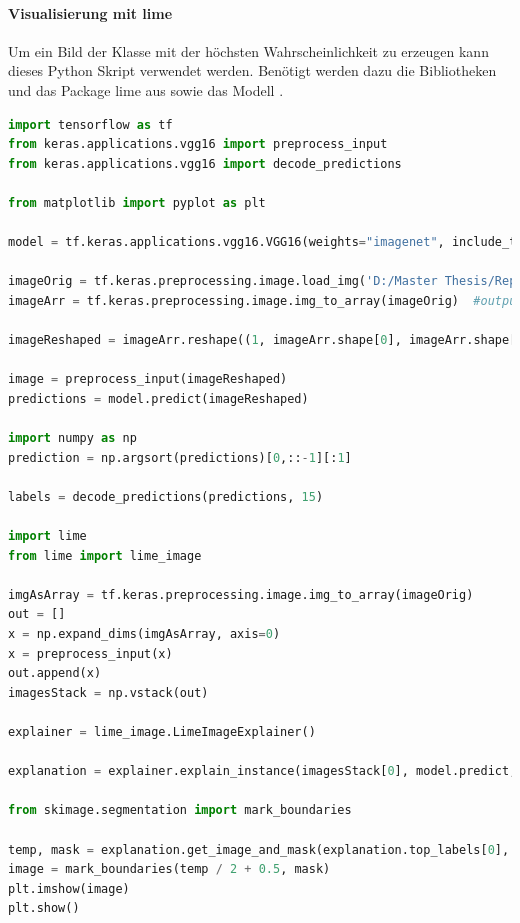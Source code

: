 \documentclass[
  12pt, %
  a4paper, %
  oneside, %
  openany, 
  numbers=noenddot, %
  BCOR=5mm, %
  parskip=half*, %
  thesis, %
]{bfhbook}
\begin{document}
\paragraph*{Visualisierung mit lime}
\break
Um ein Bild der Klasse mit der höchsten Wahrscheinlichkeit zu erzeugen kann dieses Python Skript verwendet werden. Benötigt werden dazu die Bibliotheken \parencite{TensorFlow} und das Package lime aus \parencite{limeKeras} sowie das Modell \parencite{vgg16}.
\begin{lstlisting}[language=Python, caption=Lime Visualisierung für die wahrscheinlichste Klasse]
import tensorflow as tf
from keras.applications.vgg16 import preprocess_input
from keras.applications.vgg16 import decode_predictions

from matplotlib import pyplot as plt

model = tf.keras.applications.vgg16.VGG16(weights="imagenet", include_top=True)

imageOrig = tf.keras.preprocessing.image.load_img('D:/Master Thesis/Repo/Test Images/tabby.2.JPG', target_size=(224, 224))
imageArr = tf.keras.preprocessing.image.img_to_array(imageOrig)  #output Numpy-array

imageReshaped = imageArr.reshape((1, imageArr.shape[0], imageArr.shape[1], imageArr.shape[2]))

image = preprocess_input(imageReshaped)
predictions = model.predict(imageReshaped)

import numpy as np
prediction = np.argsort(predictions)[0,::-1][:1]

labels = decode_predictions(predictions, 15)
    
import lime 
from lime import lime_image

imgAsArray = tf.keras.preprocessing.image.img_to_array(imageOrig)
out = []
x = np.expand_dims(imgAsArray, axis=0)
x = preprocess_input(x)
out.append(x)
imagesStack = np.vstack(out)
            
explainer = lime_image.LimeImageExplainer()

explanation = explainer.explain_instance(imagesStack[0], model.predict, top_labels=1, hide_color=0, num_samples=1000)

from skimage.segmentation import mark_boundaries

temp, mask = explanation.get_image_and_mask(explanation.top_labels[0], positive_only=True, num_features=5, hide_rest=True)
image = mark_boundaries(temp / 2 + 0.5, mask)
plt.imshow(image)
plt.show()
\end{lstlisting}
\end{document}
